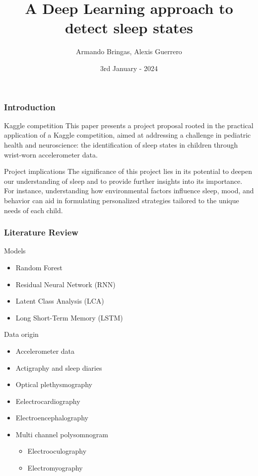 \documentclass[10pt]{beamer}
\title{\Huge{A Deep Learning approach to detect sleep states}}
\author{Armando Bringas, Alexis Guerrero}
\date{3rd January - 2024}
\begin{document}
\begin{frame}
  \titlepage
\end{frame}

\begin{frame}
  \frametitle{Introduction}
  \begin{block}{Kaggle competition}
    This paper presents a project proposal rooted in the practical application of a Kaggle competition,
aimed at addressing a challenge in pediatric health and neuroscience: the identification of sleep states
in children through wrist-worn accelerometer data.
  \end{block}
  \begin{block}{Project implications}
    The significance of this project lies in its potential to deepen our understanding of sleep and to provide
further insights into its importance. For instance, understanding how environmental factors influence
sleep, mood, and behavior can aid in formulating personalized strategies tailored to the unique needs
of each child.
  \end{block} 
\end{frame}

\begin{frame}
  \frametitle{Literature Review}
  \begin{block}{Models}
    \begin{itemize}
    \item Random Forest
    \item Residual Neural Network (RNN)
    \item Latent Class Analysis (LCA)
    \item Long Short-Term Memory (LSTM)
    \end{itemize}
  \end{block}
  \begin{block}{Data origin}
    \begin{itemize}
    \item Accelerometer data
    \item Actigraphy and sleep diaries
    \item Optical plethysmography
    \item Eelectrocardiography
    \item Electroencephalography
    \item Multi channel polysomnogram
      \begin{itemize}
      \item Electrooculography
      \item Electromyography
      \end{itemize}
    \end{itemize}
  \end{block} 
\end{frame}
\end{document}
